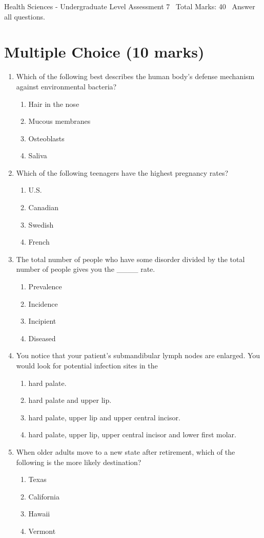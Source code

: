 \documentclass[12pt]{article}
\begin{document}
\begin{center}
Health Sciences - Undergraduate Level Assessment 7 \
Total Marks: 40 \
Answer all questions.
\end{center}

\section*{Multiple Choice (10 marks)}
\begin{enumerate}[label=\arabic*.]
\item Which of the following best describes the human body's defense mechanism against environmental bacteria?
\begin{enumerate}[label=(\alph*)]
    \item Hair in the nose
    \item Mucous membranes
    \item Osteoblasts
    \item Saliva
\end{enumerate}
\item Which of the following teenagers have the highest pregnancy rates?
\begin{enumerate}[label=(\alph*)]
    \item U.S.
    \item Canadian
    \item Swedish
    \item French
\end{enumerate}
\item The total number of people who have some disorder divided by the total number of people gives you the \_\_\_\_ rate.
\begin{enumerate}[label=(\alph*)]
    \item Prevalence
    \item Incidence
    \item Incipient
    \item Diseased
\end{enumerate}
\item You notice that your patient's submandibular lymph nodes are enlarged. You would look for potential infection sites in the
\begin{enumerate}[label=(\alph*)]
    \item hard palate.
    \item hard palate and upper lip.
    \item hard palate, upper lip and upper central incisor.
    \item hard palate, upper lip, upper central incisor and lower first molar.
\end{enumerate}
\item When older adults move to a new state after retirement, which of the following is the more likely destination?
\begin{enumerate}[label=(\alph*)]
    \item Texas
    \item California
    \item Hawaii
    \item Vermont
\end{enumerate}
\end{enumerate}
\end{document}
